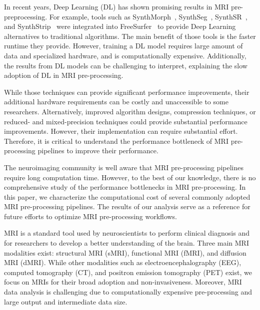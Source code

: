 \documentclass[conference]{IEEEtran}
\begin{document}
In recent years, Deep Learning (DL) has shown promising results in MRI pre-preprocessing. For example, tools such as SynthMorph~\cite{Hoffmann2022-hu}, SynthSeg~\cite{Billot2023-vp}, SynthSR~\cite{Iglesias2023-bp}, and SynthStrip~\cite{Hoopes2022-ms} were integrated into FreeSurfer~\cite{Fischl2012-cx} to provide Deep Learning alternatives to traditional algorithms. The main benefit of those tools is the faster runtime they provide.
However, training a DL model requires large amount of data and specialized hardware, and is computationally expensive. Additionally, the results from DL models can be challenging to interpret, explaining the slow adoption of DL in MRI pre-processing.

While those techniques can provide significant performance improvements, their additional hardware requirements can be costly and unaccessible to some researchers. Alternatively, improved algorithm designs, compression techniques, or reduced- and mixed-precision techniques could provide substantial performance improvements. However, their implementation can require substantial effort. Therefore, it is critical to understand the performance bottleneck of MRI pre-processing pipelines to improve their performance.

The neuroimaging community is well aware that MRI pre-processing pipelines require long computation time. However, to the best of our knowledge, there is no comprehensive study of the performance bottlenecks in MRI pre-processing. In this paper, we characterize the computational cost of several commonly adopted MRI pre-processing pipelines. The results of our analysis serve as a reference for future efforts to optimize MRI pre-processing workflows.

MRI is a standard tool used by neuroscientists to perform clinical diagnosis and for researchers to develop a better understanding of the brain. Three main MRI modalities exist: structural MRI (sMRI), functional MRI (fMRI), and diffusion MRI (dMRI). While other modalities such as electroencephalography (EEG), computed tomography (CT), and positron emission tomography (PET) exist, we focus on MRIs for their broad adoption and non-invasiveness. Moreover, MRI data analysis is challenging due to computationally expensive pre-processing and large output and intermediate data size.
\end{document}
